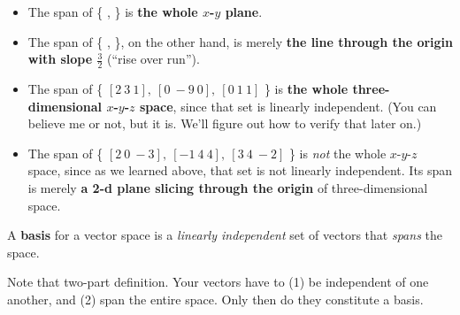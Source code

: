 \vspace{-.15in}
\begin{itemize}

\item The span of \{ 
,
\} is \textbf{the whole $x$-$y$ plane}.

\item The span of \{
,
\}, on the other hand, is merely \textbf{the line through the origin with slope
$\frac{3}{2}$} (``rise over run'').



\item The span of \{ $[2 \ 3 \ 1],\  [0 \ -9 \ 0], \ [0 \ 1 \ 1]$ \} is
\textbf{the whole three-dimensional $x$-$y$-$z$ space}, since that set is
linearly independent. (You can believe me or not, but it is. We'll figure out
how to verify that later on.)

\item The span of \{ $[2 \ 0 \ -3],\  [-1 \ 4 \ 4],\  [3 \ 4 \ -2]$ \} is
\textit{not} the whole $x$-$y$-$z$ space, since as we learned above, that set
is not linearly independent. Its span is merely \textbf{a 2-d plane slicing
through the origin} of three-dimensional space.

\end{itemize}


\label{basis}

\begin{framed}
A \textbf{basis} for a vector space is a \textit{linearly independent} set of
vectors that \textit{spans} the space.
\end{framed}

Note that two-part definition. Your vectors have to (1) be independent of one
another, and (2) span the entire space. Only then do they constitute a basis.


